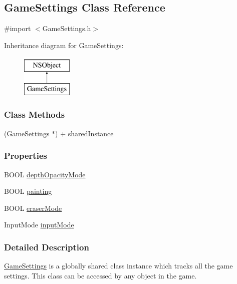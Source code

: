 \hypertarget{interface_game_settings}{\subsection{Game\-Settings Class Reference}
\label{d1/d0c/interface_game_settings}
}


{\ttfamily \#import $<$Game\-Settings.\-h$>$}

Inheritance diagram for Game\-Settings\-:\begin{figure}[H]
\begin{center}
\leavevmode
\includegraphics[height=2.000000cm]{d1/d0c/interface_game_settings}
\end{center}
\end{figure}
\subsubsection*{Class Methods}
\begin{DoxyCompactItemize}
\item 
(\hyperlink{interface_game_settings}{Game\-Settings} $\ast$) + \hyperlink{interface_game_settings_abdcc2e77ea14381a85c6de67c83df624}{shared\-Instance}
\end{DoxyCompactItemize}
\subsubsection*{Properties}
\begin{DoxyCompactItemize}
\item 
B\-O\-O\-L \hyperlink{interface_game_settings_a1ac5ddcb61e46f952ccd0e876a8578a4}{depth\-Opacity\-Mode}
\item 
B\-O\-O\-L \hyperlink{interface_game_settings_a83ea5a83eca0198be2e302aa782d8cf9}{painting}
\item 
B\-O\-O\-L \hyperlink{interface_game_settings_ab192ff4717d84e69f4e3a32a4e38d6b8}{eraser\-Mode}
\item 
Input\-Mode \hyperlink{interface_game_settings_a57e428fbdeeb3dbffa09bb7ffcf6b057}{input\-Mode}
\end{DoxyCompactItemize}


\subsubsection{Detailed Description}
\hyperlink{interface_game_settings}{Game\-Settings} is a globally shared class instance which tracks all the game settings. This class can be accessed by any object in the game. 

